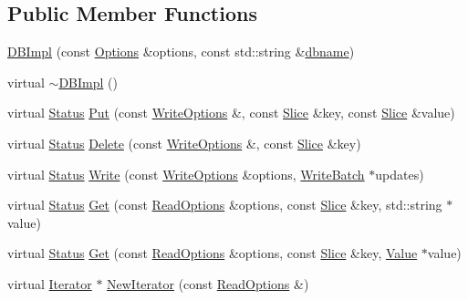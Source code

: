 \subsection*{Public Member Functions}
\begin{DoxyCompactItemize}
\item 
\hyperlink{classleveldb_1_1_d_b_impl_a269b55605b27271d6ca5fee68af0d8f3}{D\+B\+Impl} (const \hyperlink{structleveldb_1_1_options}{Options} \&options, const std\+::string \&\hyperlink{c__test_8c_a75d845559336df6843f3b599960f89d2}{dbname})
\item 
virtual \hyperlink{classleveldb_1_1_d_b_impl_a07a233a94a2531aed9d3718c9b9ed40d}{$\sim$\+D\+B\+Impl} ()
\item 
virtual \hyperlink{classleveldb_1_1_status}{Status} \hyperlink{classleveldb_1_1_d_b_impl_ad0d56aeb4d84ff9632c9a7f3f1b7c4d5}{Put} (const \hyperlink{structleveldb_1_1_write_options}{Write\+Options} \&, const \hyperlink{classleveldb_1_1_slice}{Slice} \&key, const \hyperlink{classleveldb_1_1_slice}{Slice} \&value)
\item 
virtual \hyperlink{classleveldb_1_1_status}{Status} \hyperlink{classleveldb_1_1_d_b_impl_af050f77e8c22bd6638fed5a46a59399d}{Delete} (const \hyperlink{structleveldb_1_1_write_options}{Write\+Options} \&, const \hyperlink{classleveldb_1_1_slice}{Slice} \&key)
\item 
virtual \hyperlink{classleveldb_1_1_status}{Status} \hyperlink{classleveldb_1_1_d_b_impl_ac0d0b472717099d6a02ad9dace4e8ef4}{Write} (const \hyperlink{structleveldb_1_1_write_options}{Write\+Options} \&options, \hyperlink{classleveldb_1_1_write_batch}{Write\+Batch} $\ast$updates)
\item 
virtual \hyperlink{classleveldb_1_1_status}{Status} \hyperlink{classleveldb_1_1_d_b_impl_a089964ddcd1f5dc85e73499ae57be508}{Get} (const \hyperlink{structleveldb_1_1_read_options}{Read\+Options} \&options, const \hyperlink{classleveldb_1_1_slice}{Slice} \&key, std\+::string $\ast$value)
\item 
virtual \hyperlink{classleveldb_1_1_status}{Status} \hyperlink{classleveldb_1_1_d_b_impl_a9bf8bbc86455a00b1d9c75b81254feba}{Get} (const \hyperlink{structleveldb_1_1_read_options}{Read\+Options} \&options, const \hyperlink{classleveldb_1_1_slice}{Slice} \&key, \hyperlink{classleveldb_1_1_value}{Value} $\ast$value)
\item 
virtual \hyperlink{classleveldb_1_1_iterator}{Iterator} $\ast$ \hyperlink{classleveldb_1_1_d_b_impl_ae955dc8f2a1c38588723a0882653cb58}{New\+Iterator} (const \hyperlink{structleveldb_1_1_read_options}{Read\+Options} \&)

\end{DoxyCompactItemize}
